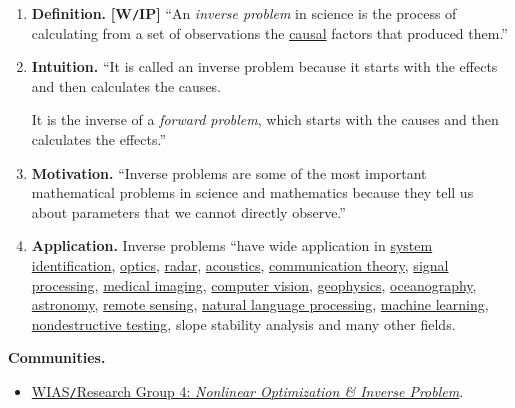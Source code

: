 \documentclass[oneside]{article}
\numberwithin{equation}{section}
\begin{document}
\begin{enumerate}
    \item \textbf{Definition.} \textbf{[W\texttt{/}IP]} ``An \textit{inverse problem} in science is the process of calculating from a set of observations the \href{https://en.wikipedia.org/wiki/Causal}{causal} factors that produced them.''
    \item \textbf{Intuition.} ``It is called an inverse problem because it starts with the effects and then calculates the causes.
    
    It is the inverse of a \textit{forward problem}, which starts with the causes and then calculates the effects.''
    \item \textbf{Motivation.} ``Inverse problems are some of the most important mathematical problems in science and mathematics because they tell us about parameters that we cannot directly observe.''
    \item \textbf{Application.} Inverse problems ``have wide application in \href{https://en.wikipedia.org/wiki/System_identification}{system identification}, \href{https://en.wikipedia.org/wiki/Optics}{optics}, \href{https://en.wikipedia.org/wiki/Radar}{radar}, \href{https://en.wikipedia.org/wiki/Acoustics}{acoustics}, \href{https://en.wikipedia.org/wiki/Communication_theory}{communication theory}, \href{https://en.wikipedia.org/wiki/Signal_processing}{signal processing}, \href{https://en.wikipedia.org/wiki/Medical_imaging}{medical imaging}, \href{https://en.wikipedia.org/wiki/Computer_vision}{computer vision}, \href{https://en.wikipedia.org/wiki/Geophysics}{geophysics}, \href{https://en.wikipedia.org/wiki/Oceanography}{oceanography}, \href{https://en.wikipedia.org/wiki/Astronomy}{astronomy}, \href{https://en.wikipedia.org/wiki/Remote_sensing}{remote sensing}, \href{https://en.wikipedia.org/wiki/Natural_language_processing}{natural language processing}, \href{https://en.wikipedia.org/wiki/Machine_learning}{machine learning}, \href{https://en.wikipedia.org/wiki/Nondestructive_testing}{nondestructive testing}, slope stability analysis and many other fields.
\end{enumerate}
\textbf{Communities.}
\begin{itemize}
    \item \href{https://www.wias-berlin.de/research/rgs/fg4/index.jsp}{WIAS\texttt{/}Research Group 4: \textit{Nonlinear Optimization \& Inverse Problem}}.
\end{itemize}
\end{document}
